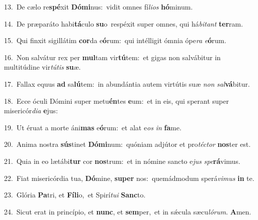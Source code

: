 {\numbfont\textcolor{\numbcolor}{13.}}~De cælo re\-\textbf{spé}\-xit \textbf{Dó}\-\textbf{mi}nus:~\star vidit omnes fí\-\textit{li}\-\textit{os} \textbf{hó}\-minum.\par
{\numbfont\textcolor{\numbcolor}{14.}}~De præparáto habi\-\textbf{tá}\-culo \textbf{su}\-o~\star respéxit super omnes, qui há\-\textit{bi}\-\textit{tant} \textbf{ter}\-ram.\par
{\numbfont\textcolor{\numbcolor}{15.}}~Qui finxit sigillátim \textbf{cor}\-da e\-\textbf{ó}\-rum:~\star qui intélligit ómnia ópe\textit{ra} \textit{e}\-\textbf{ó}rum.\par
{\numbfont\textcolor{\numbcolor}{16.}}~Non salvátur rex per \textbf{mul}\-tam vir\-\textbf{tú}\-tem:~\star et gigas non salvábitur in multitúdine vir\-\textit{tú}\-\textit{tis} \textbf{su}\-æ.\par
{\numbfont\textcolor{\numbcolor}{17.}}~Fallax equus \textbf{ad} sa\-\textbf{lú}\-tem:~\star in abundántia autem virtútis suæ \textit{non} \textit{sal}\-\textbf{vá}bitur.\par
{\numbfont\textcolor{\numbcolor}{18.}}~Ecce óculi Dómini super metu\-\textbf{én}\-tes \textbf{e}\-um:~\star et in eis, qui sperant super misericór\-\textit{di}\-\textit{a} \textbf{e}\-jus:\par
{\numbfont\textcolor{\numbcolor}{19.}}~Ut éruat a morte áni\textbf{mas} e\-\textbf{ó}\-rum:~\star et alat e\textit{os} \textit{in} \textbf{fa}\-me.\par
{\numbfont\textcolor{\numbcolor}{20.}}~Anima nostra \textbf{sús}\-tinet \textbf{Dó}\-\textbf{mi}num:~\star quóniam adjútor et pro\-\textit{téc}\-\textit{tor} \textbf{nos}\-ter est.\par
{\numbfont\textcolor{\numbcolor}{21.}}~Quia in eo lætábi\textbf{tur} cor \textbf{nos}\-trum:~\star et in nómine sancto e\textit{jus} \textit{spe}\-\textbf{rá}vimus.\par
{\numbfont\textcolor{\numbcolor}{22.}}~Fiat misericórdia tua, \textbf{Dó}\-mine, \textbf{su}\-\textbf{per} nos:~\star quemádmodum sperá\-\textit{vi}\-\textit{mus} \textbf{in} te.\par
{\numbfont\textcolor{\numbcolor}{23.}}~Glória \textbf{Pa}\-tri, et \textbf{Fí}\-\textbf{li}o,~\star et Spirí\-\textit{tu}\-\textit{i} \textbf{Sanc}\-to.\par
{\numbfont\textcolor{\numbcolor}{24.}}~Sicut erat in princípio, et \textbf{nunc}\-, et \textbf{sem}\-per,~\star et in sǽcula sæcu\-\textit{ló}\-\textit{rum}. \textbf{A}\-men.\par
